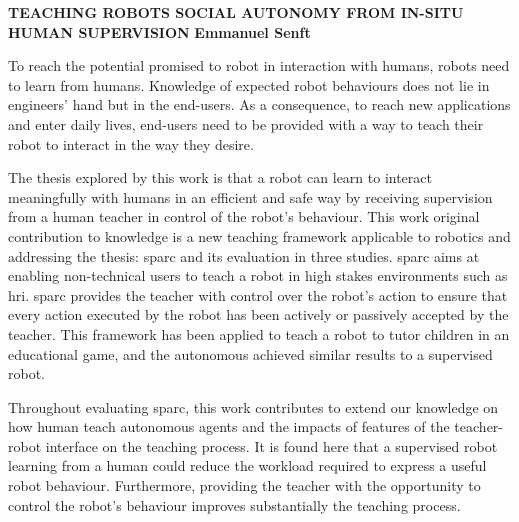 \textbf{TEACHING ROBOTS SOCIAL AUTONOMY FROM IN-SITU HUMAN SUPERVISION}\newline
\textbf{Emmanuel Senft}

To reach the potential promised to robot in interaction with humans, robots need to learn from humans. Knowledge of expected robot behaviours does not lie in engineers' hand but in the end-users. As a consequence, to reach new applications and enter daily lives, end-users need to be provided with a way to teach their robot to interact in the way they desire.

The thesis explored by this work is that a robot can learn to interact meaningfully with humans in an efficient and safe way by receiving supervision from a human teacher in control of the robot's behaviour. This work original contribution to knowledge is a new teaching framework applicable to robotics and addressing the thesis: \gls{sparc} and its evaluation in three studies. \gls{sparc} aims at enabling non-technical users to teach a robot in high stakes environments such as \gls{hri}. \gls{sparc} provides the teacher with control over the robot's action to ensure that every action executed by the robot has been actively or passively accepted by the teacher. This framework has been applied to teach a robot to tutor children in an educational game, and the autonomous achieved similar results to a supervised robot.

Throughout evaluating \gls{sparc}, this work contributes to extend our knowledge on how human teach autonomous agents and the impacts of features of the teacher-robot interface on the teaching process. It is found here that a supervised robot learning from a human could reduce the workload required to express a useful robot behaviour. Furthermore, providing the teacher with the opportunity to control the robot's behaviour improves substantially the teaching process.





